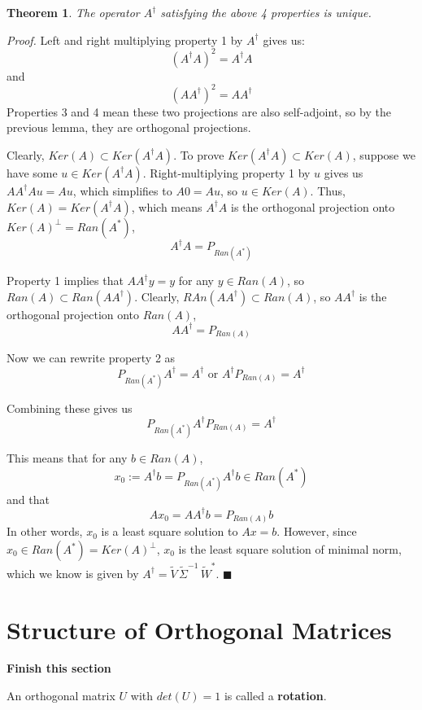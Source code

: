 \documentclass[a4paper,10pt]{book}
\theoremstyle{plain}
\newtheorem{theorem}{Theorem}[section]
\renewenvironment{proof}{\textsl{Proof.}}{\hfill$\blacksquare$}
\theoremstyle{plain}
\theoremstyle{definition}
\begin{document}
\begin{theorem}
The operator $A^{\dagger}$ satisfying the above 4 properties is unique. 
\end{theorem}

\begin{proof}
Left and right multiplying property 1 by $A^{\dagger}$ gives us: 
$$(A^{\dagger} A)^{2} = A^{\dagger} A$$ 
and
$$ (AA^{\dagger})^{2} = AA^{\dagger}$$
Properties 3 and 4 mean these two projections are also self-adjoint, so by the previous lemma, they are orthogonal projections. 

Clearly, $Ker(A) \subset Ker(A^{\dagger}A)$. To prove $Ker(A^{\dagger} A) \subset Ker(A)$, suppose we have some $u \in Ker(A^{\dagger} A)$. Right-multiplying property 1 by $u$ gives us $AA^{\dagger}Au = Au$, which simplifies to $A0 = Au$, so $u \in Ker(A)$. Thus, $Ker(A) = Ker(A^{\dagger}A)$, which means $A^{\dagger}A$ is the orthogonal projection onto $Ker(A)^{\perp} = Ran(A^{*})$, 
$$A^{\dagger}A = P_{Ran(A^{*})}$$

Property 1 implies that $AA^{\dagger} y = y$ for any $y \in Ran(A)$, so $Ran(A) \subset Ran(AA^{\dagger})$. Clearly, $RAn(AA^{\dagger}) \subset Ran(A)$, so $AA^{\dagger}$ is the orthogonal projection onto $Ran(A)$, 
$$AA^{\dagger} = P_{Ran(A)}$$

Now we can rewrite property 2 as 
$$P_{Ran(A^{*})} A^{\dagger} = A^{\dagger} \text{ or } A^{\dagger} P_{Ran(A)} = A^{\dagger}$$

Combining these gives us 
$$P_{Ran(A^{*})} A^{\dagger} P_{Ran(A)} = A^{\dagger}$$

This means that for any $b \in Ran(A)$, 
$$x_{0} := A^{\dagger} b = P_{Ran(A^{*})} A^{\dagger} b \in Ran(A^{*})$$
and that 
$$Ax_{0} = AA^{\dagger} b = P_{Ran(A)} b$$
In other words, $x_{0}$ is a least square solution to $Ax = b$. However, since $x_{0} \in Ran(A^{*}) = Ker(A)^{\perp}$, $x_{0}$ is the least square solution of minimal norm, which we know is given by $A^{\dagger} = \widetilde{V} \, \widetilde{\Sigma}^{-1} \, \widetilde{W}^{*}$.
\end{proof}

\section{Structure of Orthogonal Matrices}
\textbf{Finish this section}

An orthogonal matrix $U$ with $det(U) = 1$ is called a \textbf{rotation}. 
\end{document}

